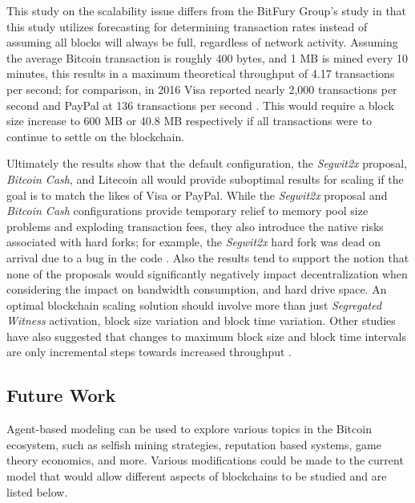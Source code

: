 \documentclass[12pt]{report}
\begin{document}
This study on the scalability issue differs from the BitFury Group's study in that this study utilizes forecasting for determining transaction rates instead of assuming all blocks will always be full, regardless of network activity. Assuming the average Bitcoin transaction is roughly 400 bytes, and 1 MB is mined every 10 minutes, this results in a maximum theoretical throughput of 4.17 transactions per second; for comparison, in 2016 Visa reported nearly 2,000 transactions per second and PayPal at 136 transactions per second \cite{HerreraJoancomarti.2016}. This would require a block size increase to 600 MB or 40.8 MB respectively if all transactions were to continue to settle on the blockchain. 

Ultimately the results show that the default configuration, the \textit{Segwit2x} proposal, \textit{Bitcoin Cash}, and Litecoin all would provide suboptimal results for scaling if the goal is to match the likes of Visa or PayPal. While the \textit{Segwit2x} proposal and \textit{Bitcoin Cash} configurations provide temporary relief to memory pool size problems and exploding transaction fees, they also introduce the native risks associated with hard forks; for example, the \textit{Segwit2x} hard fork was dead on arrival due to a bug in the code \cite{Song.20171120}. Also the results tend to support the notion that none of the proposals would significantly negatively impact decentralization when considering the impact on bandwidth consumption, and hard drive space. An optimal blockchain scaling solution should involve more than just \textit{Segregated Witness} activation, block size variation and block time variation. Other studies have also suggested that changes to maximum block size and block time intervals are only incremental steps towards increased throughput \cite{Croman.2016}.

\subsection{Future Work}
\label{sec:bitcoinfuture}
Agent-based modeling can be used to explore various topics in the Bitcoin ecosystem, such as selfish mining strategies, reputation based systems, game theory economics, and more. Various modifications could be made to the current model that would allow different aspects of blockchains to be studied and are listed below.
\end{document}
